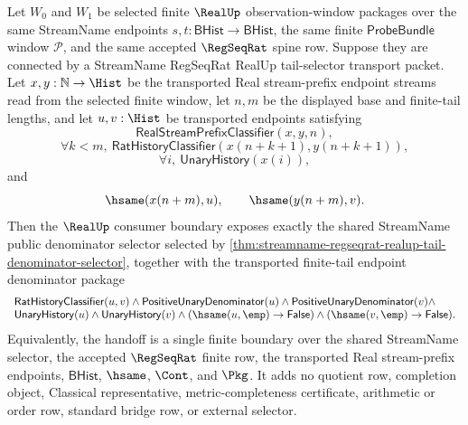 \begin{theorem}
\label{thm:realup-streamname-tail-denominator-selector-handoff}
Let $W_0$ and $W_1$ be selected finite $\RealUp$ observation-window packages
over the same StreamName endpoints $s,t:\mathsf{BHist}\to\mathsf{BHist}$, the
same finite $\mathsf{ProbeBundle}$ window $\mathcal P$, and the same accepted
$\RegSeqRat$ spine row. Suppose they are connected by a StreamName RegSeqRat
RealUp tail-selector transport packet. Let $x,y:\mathbb{N}\to\Hist$ be the
transported Real stream-prefix endpoint streams read from the selected finite
window, let $n,m$ be the displayed base and finite-tail lengths, and let
$u,v:\Hist$ be transported endpoints satisfying
$$
\mathsf{RealStreamPrefixClassifier}(x,y,n),
$$
$$
\forall k<m,\ \mathsf{RatHistoryClassifier}(x(n+k+1),y(n+k+1)),
$$
$$
\forall i,\ \mathsf{UnaryHistory}(x(i)),
$$
and
$$
\hsame(x(n+m),u),\qquad \hsame(y(n+m),v).
$$
Then the $\RealUp$ consumer boundary exposes exactly the shared StreamName
public denominator selector selected by
\autoref{thm:streamname-regseqrat-realup-tail-denominator-selector}, together
with the transported finite-tail endpoint denominator package
$$
\begin{array}{l}
\mathsf{RatHistoryClassifier}(u,v)\land
\mathsf{PositiveUnaryDenominator}(u)\land
\mathsf{PositiveUnaryDenominator}(v)\land\\
\mathsf{UnaryHistory}(u)\land
\mathsf{UnaryHistory}(v)\land
(\hsame(u,\emp)\to\mathsf{False})\land
(\hsame(v,\emp)\to\mathsf{False}).
\end{array}
$$
Equivalently, the handoff is a single finite boundary over the shared
StreamName selector, the accepted $\RegSeqRat$ finite row, the transported
Real stream-prefix endpoints, $\mathsf{BHist}$, $\hsame$, $\Cont$, and $\Pkg$.
It adds no quotient row, completion object, Classical representative,
metric-completeness certificate, arithmetic or order row, standard bridge row,
or external selector.
\end{theorem}
